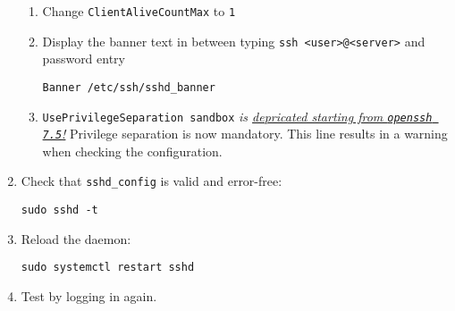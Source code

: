\begin{enumerate}
\begin{enumerate}
	\item Change \texttt{ClientAliveCountMax} to \texttt{1}

	\item Display the banner text in between typing \texttt{ssh <user>@<server>} and password entry

		\texttt{Banner /etc/ssh/sshd\_banner}

	\item \texttt{UsePrivilegeSeparation sandbox} \emph{is \href{https://www.openssh.com/txt/release-7.5}{depricated starting from \emph{\texttt{openssh 7.5}}!}} Privilege separation is now mandatory. This line results in a warning when checking the configuration.

	\end{enumerate}

\item Check that \texttt{sshd\_config} is valid and error-free:

	\texttt{sudo sshd -t}

\item Reload the daemon: 

	\texttt{sudo systemctl restart sshd}

\item Test by logging in again.

\end{enumerate}

